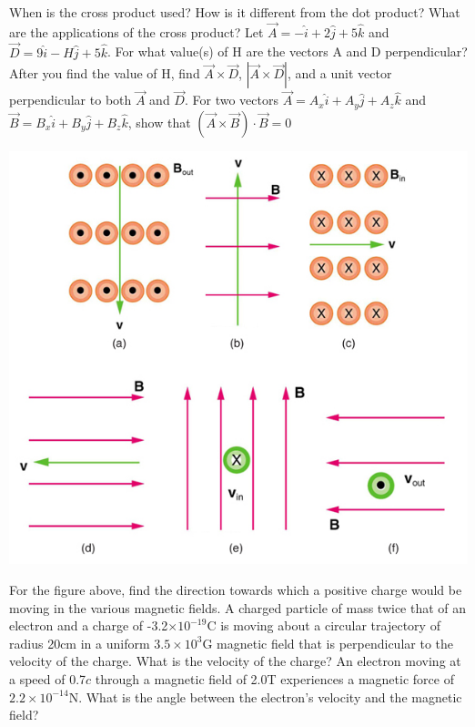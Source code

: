 \documentclass[9pt,addpoints]{exam}
\begin{document}
	\begin{questions}
		\question When is the cross product used? How is it different from the dot product? What are the applications of the cross product?
		\question Let $\vec{A}=-\hat{i}+2\hat{j}+5\hat{k}$ and $\vec{D}=9\hat{i}-H\hat{j}+5\hat{k}$. For what value(s) of H are the vectors A and D perpendicular?
		\question After you find the value of H, find $\vec{A}\times\vec{D}$, $|\vec{A}\times\vec{D}|$, and a unit vector perpendicular to both $\vec{A}$ and $\vec{D}$.
		\question For two vectors $\vec{A} = A_{x}\hat{i} + A_{y}\hat{j} + A_{z}\hat{k}$ and $\vec{B} = B_{x}\hat{i} + B_{y}\hat{j} + B_{z}\hat{k}$, show that $(\vec{A}\times\vec{B})\cdot\vec{B}=0$
		\begin{center}
			\includegraphics[scale=0.8]{hw_fields_force.jpg}
		\end{center}
		\question For the figure above, find the direction towards which a positive charge would be moving in the various magnetic fields.
		\question A charged particle of mass twice that of an electron and a charge of -3.2$\times10^{-19}$C is moving about a circular trajectory of radius 20cm in a uniform $3.5\times10^3$G magnetic field that is perpendicular to the velocity of the charge. What is the velocity of the charge?
		\question An electron moving at a speed of 0.7$c$ through a magnetic field of 2.0T experiences a magnetic force of $2.2\times10^{-14}$N. What is the angle between the electron's velocity and the magnetic field?

\end{questions}
\end{document}
